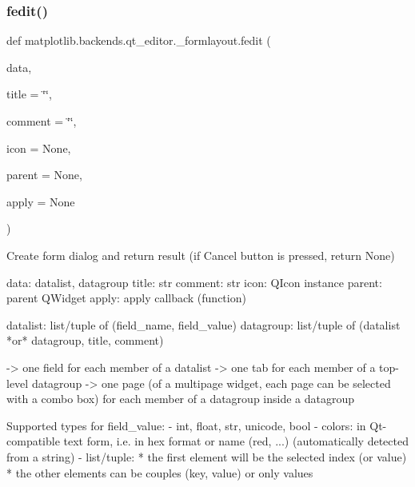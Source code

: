 \subsubsection{\texorpdfstring{fedit()}{fedit()}}
{\footnotesize\ttfamily def matplotlib.\+backends.\+qt\+\_\+editor.\+\_\+formlayout.\+fedit (\begin{DoxyParamCaption}\item[{}]{data,  }\item[{}]{title = {\ttfamily \char`\"{}\char`\"{}},  }\item[{}]{comment = {\ttfamily \char`\"{}\char`\"{}},  }\item[{}]{icon = {\ttfamily None},  }\item[{}]{parent = {\ttfamily None},  }\item[{}]{apply = {\ttfamily None} }\end{DoxyParamCaption})}

\begin{DoxyVerb}Create form dialog and return result
(if Cancel button is pressed, return None)

data: datalist, datagroup
title: str
comment: str
icon: QIcon instance
parent: parent QWidget
apply: apply callback (function)

datalist: list/tuple of (field_name, field_value)
datagroup: list/tuple of (datalist *or* datagroup, title, comment)

-> one field for each member of a datalist
-> one tab for each member of a top-level datagroup
-> one page (of a multipage widget, each page can be selected with a combo
   box) for each member of a datagroup inside a datagroup

Supported types for field_value:
  - int, float, str, unicode, bool
  - colors: in Qt-compatible text form, i.e. in hex format or name
            (red, ...) (automatically detected from a string)
  - list/tuple:
      * the first element will be the selected index (or value)
      * the other elements can be couples (key, value) or only values
\end{DoxyVerb}
 \mbox{\label{namespacematplotlib_1_1backends_1_1qt__editor_1_1__formlayout_a3c319853aeb7fd51557fee5f81443ec2}} 
